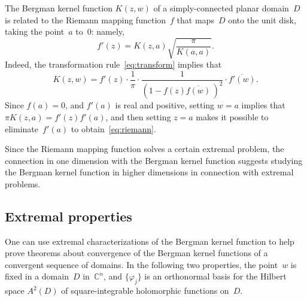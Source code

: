 \documentclass[12pt]{amsart}
\theoremstyle{definition}
\newcommand{\C}{\mathbb{C}}
\begin{document}
The Bergman kernel function \(K(z,w)\) of a simply-connected
planar domain~\(D\) is related to the Riemann mapping
function~\(f\) that maps~\(D\) onto the unit disk, taking the
point~\(a\) to~\(0\): namely,
\begin{equation}
\label{eq:riemann}
f'(z)=K(z,a)\sqrt{\frac{\pi}{K(a,a)}}.
\end{equation}
Indeed, the  transformation rule~\eqref{eq:transform} implies that
\begin{equation*}
K(z,w)=f'(z)\cdot\frac{1}{\pi}\cdot
\frac{1}{(1-f(z)\overline{f(w)}\,)^2}\cdot\overline{f'(w)}.
\end{equation*}
Since \(f(a)=0\), and \(f'(a)\) is real and positive,
setting \(w=a\) implies that
\begin{math}
\pi K(z,a)=f'(z) f'(a)
\end{math},
and then setting \(z=a\) makes it possible to eliminate~\(f'(a)\)
to obtain~\eqref{eq:riemann}.

Since the Riemann mapping function solves a certain extremal
problem, the connection in one dimension with the Bergman kernel
function suggests studying the Bergman kernel function in higher
dimensions in connection with extremal problems.

\subsection{Extremal properties}
\label{extremal}
One can use extremal characterizations of the Bergman kernel
function to help prove theorems about convergence of the Bergman
kernel functions of a convergent sequence of domains.  In the
following two properties, the point~\(w\) is fixed in a
domain~\(D\) in~\(\C^n\), and \(\{\varphi_j\}\) is an orthonormal
basis for the Hilbert space \(A^2(D)\) of square-integrable
holomorphic functions on~\(D\).
\end{document}
